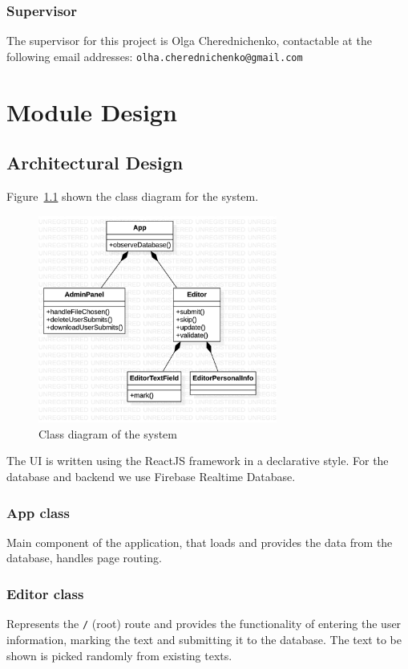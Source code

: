 \documentclass[a4paper,14pt,oneside,final]{memoir}
\begin{document}
\subsection{Supervisor}
The supervisor for this project is Olga Cherednichenko, contactable at the following email addresses: \texttt{olha.cherednichenko@gmail.com}

\chapter{Module Design}
\section{Architectural Design}
Figure~\ref{fig:class} shown the class diagram for the system.

\begin{figure}[h]
    \centering
    \includegraphics[width=0.7\textwidth]{fig_class}
    \caption{Class diagram of the system}
    \label{fig:class}
\end{figure}

The UI is written using the ReactJS framework in a declarative style. For the database and backend we use Firebase Realtime Database.

\subsection{App class}
Main component of the application, that loads and provides the data from the database, handles page routing.

\subsection{Editor class}
Represents the \texttt{/} (root) route and provides the functionality of entering the user information, marking the text and submitting it to the database. The text to be shown is picked randomly from existing texts.
\end{document}
